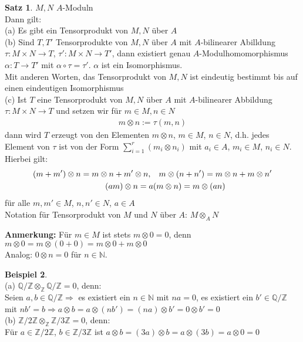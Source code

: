 \documentclass[10pt,a4paper,numbers=endperiod]{scrreprt}
\theoremstyle{definition}
\newtheorem{satz}{Satz}[section]
\newtheorem{bsp}[satz]{Beispiel}
\def\QQ{{\mathbb Q}}
\def\NN{{\mathbb N}}
\def\ZZ{{\mathbb Z}}
\begin{document}
\begin{satz}
	$M, N$ $A$-Moduln\\
	Dann gilt:\\
	(a) Es gibt ein Tensorprodukt von $M, N$ über $A$\\
	(b) Sind $T, T'$ Tensorprodukte von $M, N$ über $A$ mit $A$-bilinearer Abilldung $\tau: M \times N \to T$, $\tau': M \times N \to T'$, dann existiert genau $A$-Modulhomomorphismus $\alpha: T \to T'$ mit $\alpha \circ \tau = \tau'$. $\alpha$ ist ein Isomorphismus.\\
	Mit anderen Worten, das Tensorprodukt von $M, N$ ist eindeutig bestimmt bis auf einen eindeutigen Isomorphismus\\
	(c) Ist $T$ eine Tensorprodukt von $M, N$ über $A$ mit $A$-bilinearer Abbildung $\tau: M \times N \to T$ und setzen wir für $m \in M, n \in N$ \begin{align*}
		m \otimes n := \tau(m,n)
	\end{align*}
	dann wird $T$ erzeugt von den Elementen $m \otimes n$, $m \in M$, $n \in N$, d.h. jedes Element von $\tau$ ist von der Form $\sum\limits_{i = 1}^r (m_i \otimes n_i)$ mit $a_i \in A$, $m_i \in M$, $n_i \in N$.\\
	Hierbei gilt:\begin{align*}
		(m + m') \otimes n = m \otimes n + m' \otimes n, \hspace*{3mm} m \otimes (n + n') = m \otimes n + m \otimes n'\\
		(am) \otimes n = a (m \otimes n) = m \otimes (an) \hspace*{20mm}
	\end{align*}
	für alle $m, m' \in M$, $n, n' \in N$, $a \in A$\\
	Notation für Tensorprodukt von $M$ und $N$ über $A$: $M \otimes_A N$
\end{satz}

\textbf{Anmerkung:} Für $m \in M$ ist stets $m \otimes 0 = 0$, denn $m \otimes 0 = m \otimes (0 + 0) = m \otimes 0 + m \otimes 0$\\
Analog: $0 \otimes n = 0$ für $n \in \NN$.

\begin{bsp}
	$ $\\
	(a) $\QQ/\ZZ \otimes_\ZZ \QQ/\ZZ = 0$, denn:\\
	Seien $a, b \in \QQ/\ZZ \Rightarrow$ es existiert ein $n \in \NN$ mit $na = 0$, es existiert ein $b' \in \QQ/\ZZ$ mit $nb' = b \Rightarrow a \otimes b = a \otimes (nb') = (na) \otimes b' = 0 \otimes b' = 0$\\
	(b) $\ZZ/2\ZZ \otimes_\ZZ \ZZ/3\ZZ = 0$, denn:\\
	Für $a \in \ZZ/2\ZZ$, $b \in \ZZ/3\ZZ$ ist $a \otimes b = (3a)\otimes b = a \otimes (3b) = a \otimes 0 = 0$
\end{bsp}
\end{document}
